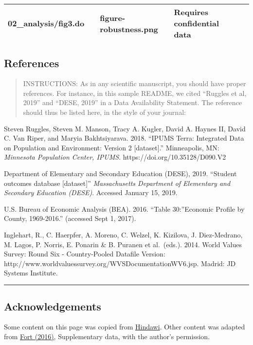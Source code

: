 \documentclass[
]{article}
\begin{document}
\begin{longtable}[]{@{}lllll@{}}
\begin{minipage}[t]{0.35\columnwidth}
02\_analysis/fig3.do\strut
\end{minipage} & \begin{minipage}[t]{0.09\columnwidth}\raggedright
\strut
\end{minipage} & \begin{minipage}[t]{0.15\columnwidth}\raggedright
figure-robustness.png\strut
\end{minipage} & \begin{minipage}[t]{0.15\columnwidth}\raggedright
Requires confidential data\strut
\end{minipage}\tabularnewline
\bottomrule
\end{longtable}

\hypertarget{references}{%
\subsection{References}\label{references}}

\begin{quote}
INSTRUCTIONS: As in any scientific manuscript, you should have proper
references. For instance, in this sample README, we cited ``Ruggles et
al, 2019'' and ``DESE, 2019'' in a Data Availability Statement. The
reference should thus be listed here, in the style of your journal:
\end{quote}

Steven Ruggles, Steven M. Manson, Tracy A. Kugler, David A. Haynes II,
David C. Van Riper, and Maryia Bakhtsiyarava. 2018. ``IPUMS Terra:
Integrated Data on Population and Environment: Version 2
{[}dataset{]}.'' Minneapolis, MN: \emph{Minnesota Population Center,
IPUMS}. https://doi.org/10.35128/D090.V2

Department of Elementary and Secondary Education (DESE), 2019. ``Student
outcomes database {[}dataset{]}'' \emph{Massachusetts Department of
Elementary and Secondary Education (DESE)}. Accessed January 15, 2019.

U.S. Bureau of Economic Analysis (BEA). 2016. ``Table 30:''Economic
Profile by County, 1969-2016.'' (accessed Sept 1, 2017).

Inglehart, R., C. Haerpfer, A. Moreno, C. Welzel, K. Kizilova, J.
Diez-Medrano, M. Lagos, P. Norris, E. Ponarin \& B. Puranen et
al.~(eds.). 2014. World Values Survey: Round Six - Country-Pooled
Datafile Version:
http://www.worldvaluessurvey.org/WVSDocumentationWV6.jsp. Madrid: JD
Systems Institute.

\begin{center}\rule{0.5\linewidth}{0.5pt}\end{center}

\hypertarget{acknowledgements}{%
\subsection{Acknowledgements}\label{acknowledgements}}

Some content on this page was copied from
\href{https://www.hindawi.com/research.data/\#statement.templates}{Hindawi}.
Other content was adapted from
\href{https://doi.org/10.1593/restud/rdw057}{Fort (2016)}, Supplementary
data, with the author's permission.
\end{document}
